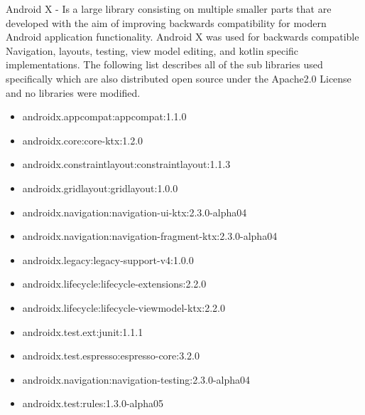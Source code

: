 Android X - Is a large library consisting on multiple smaller parts that are developed with the aim of improving backwards compatibility for modern Android application functionality. Android X was used for backwards compatible Navigation, layouts, testing, view model editing, and kotlin specific implementations. The following list describes all of the sub libraries used specifically which are also distributed open source under the Apache2.0 License and no libraries were modified. \cite{APACHE2LICENSE}
    \begin{itemize}
        \item androidx.appcompat:appcompat:1.1.0
        \item androidx.core:core-ktx:1.2.0
        \item androidx.constraintlayout:constraintlayout:1.1.3
        \item androidx.gridlayout:gridlayout:1.0.0
        \item androidx.navigation:navigation-ui-ktx:2.3.0-alpha04
        \item androidx.navigation:navigation-fragment-ktx:2.3.0-alpha04
        \item androidx.legacy:legacy-support-v4:1.0.0
        \item androidx.lifecycle:lifecycle-extensions:2.2.0
        \item androidx.lifecycle:lifecycle-viewmodel-ktx:2.2.0
        \item androidx.test.ext:junit:1.1.1
        \item androidx.test.espresso:espresso-core:3.2.0
        \item androidx.navigation:navigation-testing:2.3.0-alpha04
        \item androidx.test:rules:1.3.0-alpha05
    \end{itemize}


